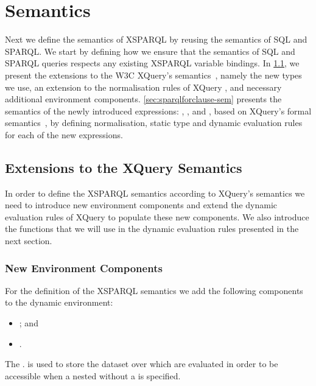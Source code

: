 \section{Semantics}
\label{sec:semantics}

Next we define the semantics of XSPARQL by reusing the semantics of \ac{SQL} and SPARQL. 
%
We start by defining how we ensure that the semantics of \ac{SQL} and SPARQL queries respects any existing XSPARQL
variable bindings.
%
In \cref{sec:chang-xquerys-semant}, we present the extensions to the \ac{W3C} XQuery's
semantics~\cite{DraperFankhauserFernandez:2010aa}, namely the new types we use, an extension to the normalisation rules
of XQuery , and necessary additional environment components.
%
\cref{sec:sparqlforclause-sem} presents the semantics of the newly introduced expressions: \SparqlForClause,
\ConstructClause, and \SQLForClause, based on XQuery's formal semantics~\cite{DraperFankhauserFernandez:2010aa}, by
defining normalisation, static type and dynamic evaluation rules for each of the new expressions.






\subsection{Extensions to the XQuery Semantics}
\label{sec:chang-xquerys-semant}

In order to define the XSPARQL semantics according to XQuery's semantics we need to introduce new environment components
and extend the dynamic evaluation rules of XQuery  to populate these new components.
%
We also introduce the functions that we will use in the dynamic evaluation rules presented in the next section.


\subsubsection{New Environment Components}
\label{sec:new-envir-comp}

For the definition of the XSPARQL semantics we add the following components to the dynamic environment:
%
\begin{itemize}[(i),noitemsep]
\item {}; and
\item {}.
\end{itemize}

The \dyn. is used to store the dataset over which  are evaluated in order to be
accessible when a nested \SparqlForClause without a \DatasetClause is specified.

